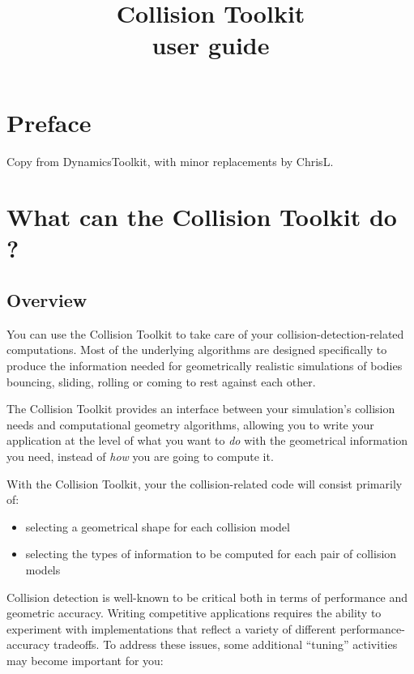 \documentclass[11pt]{article}
\title{ Collision Toolkit\\
 user guide\\ }
\begin{document}
\thispagestyle{myheadings}
\maketitle

\tableofcontents

\pagebreak

\section{ Preface}

   Copy from DynamicsToolkit, with minor replacements by ChrisL.


\section{ What can the Collision Toolkit do ? }

\subsection{ Overview }

You can use the Collision Toolkit to take care of your collision-detection-related
computations. Most of the underlying algorithms are designed
specifically to produce the information needed for geometrically realistic
simulations of bodies bouncing, sliding, rolling or coming to rest against each other.

The Collision Toolkit provides an interface between your simulation's collision needs and
computational geometry algorithms, allowing you to write your application
at the level of what you want to \emph{do} with the geometrical information you
need, instead of \emph{how} you are going to compute it.

With the Collision Toolkit, your the collision-related code will consist
primarily of: 
\begin{itemize}
\item selecting a geometrical shape for each collision model
\item selecting the types of information to be computed for each pair of
 collision models
\end{itemize}

Collision detection is well-known to be critical both in terms of
performance and geometric accuracy.  Writing competitive applications
requires the ability to experiment with implementations that reflect a
variety of different performance-accuracy tradeoffs.
To address these issues, some additional ``tuning'' activities may become important for you:
\end{document}
